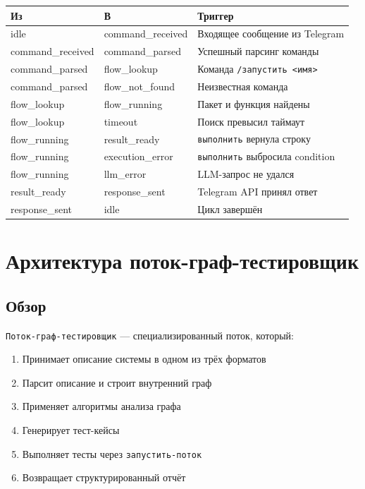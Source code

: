 \documentclass[12pt, a4paper, twoside]{article}
\begin{document}
\begin{center}
\begin{tabularx}{\textwidth}{llL}
  \toprule
  \textbf{Из} & \textbf{В} & \textbf{Триггер} \\
  \midrule
  idle & command\_received & Входящее сообщение из Telegram \\
  command\_received & command\_parsed & Успешный парсинг команды \\
  command\_parsed & flow\_lookup & Команда \texttt{/запустить <имя>} \\
  command\_parsed & flow\_not\_found & Неизвестная команда \\
  flow\_lookup & flow\_running & Пакет и функция найдены \\
  flow\_lookup & timeout & Поиск превысил таймаут \\
  flow\_running & result\_ready & \texttt{выполнить} вернула строку \\
  flow\_running & execution\_error & \texttt{выполнить} выбросила condition \\
  flow\_running & llm\_error & LLM-запрос не удался \\
  result\_ready & response\_sent & Telegram API принял ответ \\
  response\_sent & idle & Цикл завершён \\
  \bottomrule
\end{tabularx}
\end{center}

\section{Архитектура поток-граф-тестировщик}

\subsection{Обзор}

\texttt{Поток-граф-тестировщик} --- специализированный поток, который:

\begin{enumerate}[leftmargin=1.5em]
  \item Принимает описание системы в одном из трёх форматов
  \item Парсит описание и строит внутренний граф
  \item Применяет алгоритмы анализа графа
  \item Генерирует тест-кейсы
  \item Выполняет тесты через \texttt{запустить-поток}
  \item Возвращает структурированный отчёт
\end{enumerate}
\end{document}
